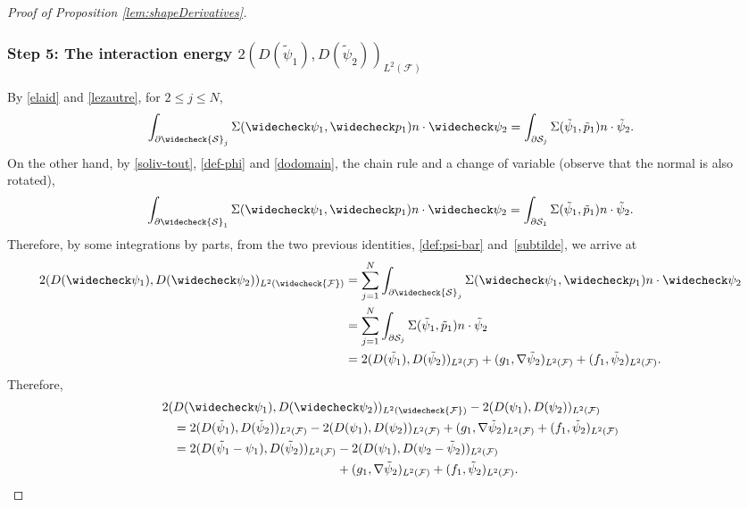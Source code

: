 \documentclass[10pt]{amsart}
\newcommand{\cS}{\mathcal{S}}
\theoremstyle{definition}
\theoremstyle{remark}
\begin{document}
\begin{proof}[Proof of Proposition \ref{lem:shapeDerivatives}]
\subsubsection*{Step 5: The interaction energy $2(D(\tilde \psi_1), D(\tilde \psi_2))_{L^2(\mathcal F)}$}
By \eqref{elaid} and \eqref{lezautre}, for \hbox{$2\leq j \leq N$},
\begin{equation*}
\int_{\partial \widecheck{\cS}_j}
\Sigma(\widecheck \psi_1,\widecheck p_1) n \cdot \widecheck \psi_2 =
\int_{\partial {\cS}_j}
\Sigma(\tilde \psi_1,\tilde p_1) n \cdot \tilde \psi_2.
\end{equation*}
On the other hand, by \eqref{soliv-tout},
\eqref{def-phi} and
\eqref{dodomain}, the chain rule and a change of variable (observe that the normal is also rotated),
\begin{equation*}
\int_{\partial \widecheck{\cS}_1}
\Sigma(\widecheck \psi_1,\widecheck p_1) n \cdot \widecheck \psi_2 =
\int_{\partial {\cS}_1}
\Sigma(\tilde \psi_1,\tilde p_1) n \cdot \tilde \psi_2.
\end{equation*}
Therefore, by some integrations by parts,
from the two previous identities, \eqref{def:psi-bar} and~\eqref{subtilde}, we arrive at
\begin{align*}
2(D(\widecheck \psi_1), D(\widecheck \psi_2))_{L^2(\widecheck{\mathcal F})}
&= \sum_{j=1}^N \int_{\partial \widecheck{\cS}_j}
\Sigma(\widecheck \psi_1,\widecheck p_1) n \cdot \widecheck \psi_2 \\
&= \sum_{j=1}^N \int_{\partial {\cS}_j}
\Sigma(\tilde \psi_1,\tilde p_1) n \cdot \tilde \psi_2 \\
&= 2(D(\tilde \psi_1), D(\tilde \psi_2))_{L^2(\mathcal F)}
+ (g_1, \nabla \tilde \psi_2)_{L^2(\mathcal F)} + (f_1, \tilde \psi_2)_{L^2(\mathcal F)}.
\end{align*}
Therefore,
\begin{align*}
2(&D(\widecheck \psi_1), D(\widecheck \psi_2))_{L^2(\widecheck{\mathcal F})} - 2(D(\psi_1), D(\psi_2))_{L^2(\mathcal F)}\\
&= 2(D(\tilde \psi_1), D(\tilde \psi_2))_{L^2(\mathcal F)} - 2(D(\psi_1), D(\psi_2))_{L^2(\mathcal F)} + (g_1, \nabla \tilde \psi_2)_{L^2(\mathcal F)} + (f_1, \tilde \psi_2)_{L^2(\mathcal F)}\\
&= 2(D(\tilde \psi_1 - \psi_1), D(\tilde \psi_2))_{L^2(\mathcal F)} - 2(D(\psi_1), D(\psi_2-\tilde \psi_2))_{L^2(\mathcal F)} \\
&\hspace*{4.6cm}+ (g_1, \nabla \tilde \psi_2)_{L^2(\mathcal F)} + (f_1, \tilde \psi_2)_{L^2(\mathcal F)}.

\end{align*}
\end{proof}
\end{document}

